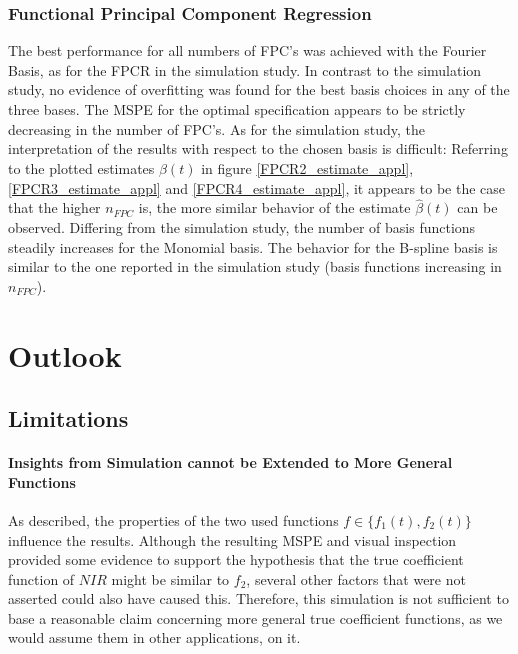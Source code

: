 \documentclass[11pt,twoside,a4paper]{article}
\begin{document}
		\subsubsection{Functional Principal Component Regression}
		The best performance for all numbers of FPC's was achieved with the Fourier Basis, as for the FPCR in the simulation study. In contrast to the simulation study, no evidence of overfitting was found for the best basis choices in any of the three bases. The MSPE for the optimal specification appears to be strictly decreasing in the number of FPC's. As for the simulation study, the interpretation of the results with respect to the chosen basis is difficult: Referring to the plotted estimates $\hat{\beta}(t)$ in figure  \ref{FPCR2_estimate_appl}, \ref{FPCR3_estimate_appl} and \ref{FPCR4_estimate_appl}, it appears to be the case that the higher $n_{FPC}$ is, the more similar behavior of the estimate $\hat{\beta}(t)$ can be observed. Differing from the simulation study, the number of basis functions steadily increases for the Monomial basis. The behavior for the B-spline basis is similar to the one reported in the simulation study (basis functions increasing in $n_{FPC}$). 
	

	\section{Outlook}\label{Outlook}
	
	\subsection*{Limitations}
	
	\paragraph{Insights from Simulation cannot be Extended to More General Functions}
	As described, the properties of the two used functions $f \in \{f_1(t), f_2(t)\}$ influence the results. Although the resulting MSPE and visual inspection provided some evidence to support the hypothesis that the true coefficient function of $NIR$ might be similar to $f_2$, several other factors that were not asserted could also have caused this. Therefore, this simulation is not sufficient to base a reasonable claim concerning more general true coefficient functions, as we would assume them in other applications, on it.
	\vspace{-0.2cm}
	
\end{document}
